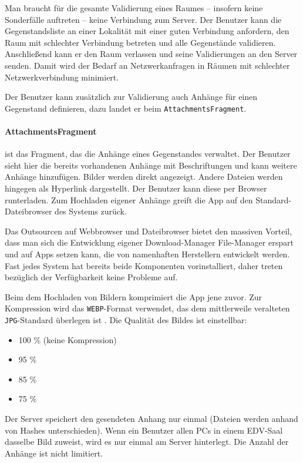 Man braucht für die gesamte Validierung eines Raumes -- insofern keine
Sonderfälle auftreten -- keine Verbindung zum Server. Der Benutzer kann
die Gegenstandsliste an einer Lokalität mit einer guten Verbindung
anfordern, den Raum mit schlechter Verbindung betreten und alle
Gegenstände validieren. Anschließend kann er den Raum verlassen und
seine Validierungen an den Server senden. Damit wird der Bedarf an
Netzwerkanfragen in Räumen mit schlechter Netzwerkverbindung minimiert.

Der Benutzer kann zusätzlich zur Validierung auch Anhänge für einen
Gegenstand definieren, dazu landet er beim \texttt{AttachmentsFragment}.

\hypertarget{attachmentsfragment}{%
\paragraph{AttachmentsFragment}\label{attachmentsfragment}}

ist das Fragment, das die Anhänge eines Gegenstandes verwaltet. Der
Benutzer sieht hier die bereits vorhandenen Anhänge mit Beschriftungen
und kann weitere Anhänge hinzufügen. Bilder werden direkt angezeigt.
Andere Dateien werden hingegen als Hyperlink dargestellt. Der Benutzer
kann diese per Browser runterladen. Zum Hochladen eigener Anhänge greift
die App auf den Standard-Dateibrowser des Systems zurück.

Das Outsourcen auf Webbrowser und Dateibrowser bietet den massiven
Vorteil, dass man sich die Entwicklung eigener Download-Manager
\bzw File-Manager erspart und auf Apps setzen kann, die von namenhaften
Herstellern entwickelt werden. Fast jedes System hat bereits beide
Komponenten vorinstalliert, daher treten bezüglich der Verfügbarkeit
keine Probleme auf.

Beim dem Hochladen von Bildern komprimiert die App jene zuvor. Zur
Kompression wird das \texttt{WEBP}-Format verwendet, das dem
mittlerweile veralteten \texttt{JPG}-Standard überlegen ist \cite{webp}.
Die Qualität des Bildes ist einstellbar:

\begin{itemize}
\tightlist
\item
  100 \% (keine Kompression)
\item
  95 \%
\item
  85 \%
\item
  75 \%
\end{itemize}

Der Server speichert den gesendeten Anhang nur einmal (Dateien werden
anhand von Hashes unterschieden). Wenn ein Benutzer allen PCs in einem
EDV-Saal dasselbe Bild zuweist, wird es nur einmal am Server hinterlegt.
Die Anzahl der Anhänge ist nicht limitiert.

